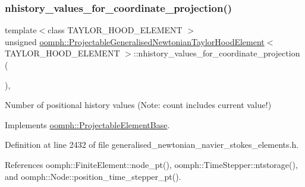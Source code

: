\subsubsection{\texorpdfstring{nhistory\+\_\+values\+\_\+for\+\_\+coordinate\+\_\+projection()}{nhistory\_values\_for\_coordinate\_projection()}}
{\footnotesize\ttfamily template$<$class T\+A\+Y\+L\+O\+R\+\_\+\+H\+O\+O\+D\+\_\+\+E\+L\+E\+M\+E\+NT $>$ \\
unsigned \hyperlink{classoomph_1_1ProjectableGeneralisedNewtonianTaylorHoodElement}{oomph\+::\+Projectable\+Generalised\+Newtonian\+Taylor\+Hood\+Element}$<$ T\+A\+Y\+L\+O\+R\+\_\+\+H\+O\+O\+D\+\_\+\+E\+L\+E\+M\+E\+NT $>$\+::nhistory\+\_\+values\+\_\+for\+\_\+coordinate\+\_\+projection (\begin{DoxyParamCaption}{ }\end{DoxyParamCaption})\hspace{0.3cm}{\ttfamily [inline]}, {\ttfamily [virtual]}}



Number of positional history values (Note\+: count includes current value!) 



Implements \hyperlink{classoomph_1_1ProjectableElementBase_ab4ecd0cd24000a3ed675dc7198203c1f}{oomph\+::\+Projectable\+Element\+Base}.



Definition at line 2432 of file generalised\+\_\+newtonian\+\_\+navier\+\_\+stokes\+\_\+elements.\+h.



References oomph\+::\+Finite\+Element\+::node\+\_\+pt(), oomph\+::\+Time\+Stepper\+::ntstorage(), and oomph\+::\+Node\+::position\+\_\+time\+\_\+stepper\+\_\+pt().

\mbox{\label{classoomph_1_1ProjectableGeneralisedNewtonianTaylorHoodElement_a5a7f30af042df73e5a62a29830333b33}} 
